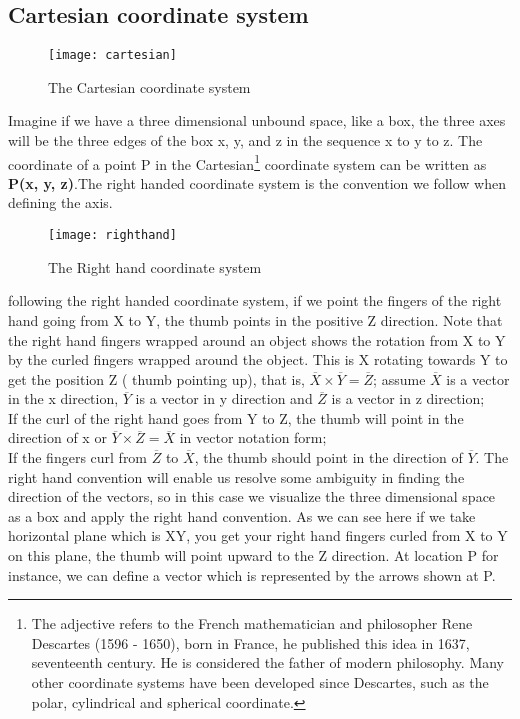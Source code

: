 	\subsection{Cartesian coordinate system}
	\begin{figure}[h]
		\centering
		\texttt{[image: cartesian]}
		\caption{The Cartesian  coordinate system}
	\end{figure}
	Imagine if we have a three dimensional unbound space, like a box, the three axes will be the three edges of the box x, y, and z in the sequence x to y to z.
	 The  coordinate of a point P in the {Cartesian}\footnote{The adjective \textacutedbl refers to the French mathematician and philosopher Rene Descartes (1596 - 1650), born in France, he published this idea in 1637, seventeenth century. He is considered the father of modern philosophy. Many other coordinate systems have been developed since Descartes, such as the polar, cylindrical and spherical coordinate.} coordinate system can be written as \textbf{ P(x, y, z)}.The right handed coordinate system is the convention we follow when defining the axis.
	 \begin{figure}[h]
	 	\centering
	 	\texttt{[image: righthand]}
	 	\caption{The Right hand   coordinate system}
	 \end{figure}
	 
	  following the right handed coordinate system, if we point the fingers of the  right hand going from X to Y, the thumb points in the positive Z direction. Note that the right hand fingers wrapped around an object shows the rotation from X to Y by the curled fingers wrapped around the object. This is X rotating towards Y to get the position Z ( thumb pointing up), that is, $\overline{X} \times \overline{Y} = \overline{Z}$; assume  $\overline{X}$ is a vector in the x direction, $\overline{Y}$ is a vector in y direction and $\overline{Z}$ is a vector in z direction;\\If the curl of the right hand goes from Y to Z, the thumb will point in the direction of x or $\overline{Y} \times \overline{Z} = \overline{X}$ in vector notation form;\\If the fingers curl from $\overline{Z}$ to $\overline{X}$, the thumb should point in the direction of $\overline{Y}$. The right hand convention will enable us resolve some ambiguity in finding the direction of the vectors, so in this case we visualize the three dimensional space as a box and apply the right hand convention. As we can see here if we take horizontal plane which is XY, you get your right hand fingers curled from X to Y on this plane, the thumb will point upward to the Z direction. At location P for instance, we can define a vector which is represented by the arrows shown at P.
 
